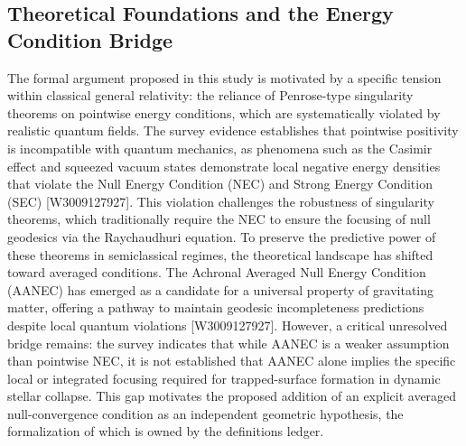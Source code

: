 \documentclass[conference]{IEEEtran}
\begin{document}
\subsection{Theoretical Foundations and the Energy Condition Bridge}
The formal argument proposed in this study is motivated by a specific tension within classical general relativity: the reliance of Penrose-type singularity theorems on pointwise energy conditions, which are systematically violated by realistic quantum fields. The survey evidence establishes that pointwise positivity is incompatible with quantum mechanics, as phenomena such as the Casimir effect and squeezed vacuum states demonstrate local negative energy densities that violate the Null Energy Condition (NEC) and Strong Energy Condition (SEC) [W3009127927]. This violation challenges the robustness of singularity theorems, which traditionally require the NEC to ensure the focusing of null geodesics via the Raychaudhuri equation. To preserve the predictive power of these theorems in semiclassical regimes, the theoretical landscape has shifted toward averaged conditions. The Achronal Averaged Null Energy Condition (AANEC) has emerged as a candidate for a universal property of gravitating matter, offering a pathway to maintain geodesic incompleteness predictions despite local quantum violations [W3009127927]. However, a critical unresolved bridge remains: the survey indicates that while AANEC is a weaker assumption than pointwise NEC, it is not established that AANEC alone implies the specific local or integrated focusing required for trapped-surface formation in dynamic stellar collapse. This gap motivates the proposed addition of an explicit averaged null-convergence condition as an independent geometric hypothesis, the formalization of which is owned by the definitions ledger.~\cite{cite_0ed84243cf171bc4}
\end{document}
